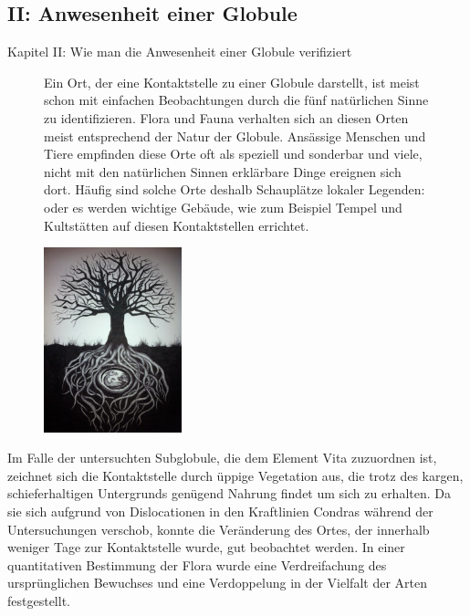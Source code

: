 \documentclass[a5paper,8pt]{book}
\begin{document}
\newpage

\subsection{II: Anwesenheit einer Globule}

Kapitel II: Wie man die Anwesenheit einer Globule verifiziert

\begin{figure}[htbp]
\begin{minipage}[t]{3cm}
\vspace{0pt}
Ein Ort, der eine Kontaktstelle zu einer Globule darstellt, ist meist schon mit einfachen Beobachtungen durch die fünf 
natürlichen Sinne zu identifizieren. Flora und Fauna verhalten sich an diesen Orten meist entsprechend der Natur der 
Globule. Ansässige Menschen und Tiere empfinden diese Orte oft als speziell und sonderbar und viele, nicht mit den 
natürlichen Sinnen erklärbare Dinge ereignen sich dort. Häufig sind solche Orte deshalb Schauplätze lokaler Legenden: 
oder es werden wichtige Gebäude, wie zum Beispiel Tempel und Kultstätten auf diesen Kontaktstellen errichtet.
\begin{minipage}[t]{4cm}
\vspace{0pt}
  \begin{flushright}
	\includegraphics[width=4cm]{pictures/drachenbaum.jpg}
  \end{flushright}
\end{minipage}
\hfill
\end{minipage}
\end{figure}

Im Falle der untersuchten Subglobule, die dem Element Vita zuzuordnen ist, zeichnet sich die Kontaktstelle durch üppige 
Vegetation aus, die trotz des kargen, schieferhaltigen Untergrunds genügend Nahrung findet um sich zu erhalten. Da sie 
sich aufgrund von Dislocationen in den Kraftlinien Condras während der Untersuchungen verschob, konnte die Veränderung 
des Ortes, der innerhalb weniger Tage zur Kontaktstelle wurde, gut beobachtet werden. In einer quantitativen Bestimmung 
der Flora wurde eine Verdreifachung des ursprünglichen Bewuchses und eine Verdoppelung in der Vielfalt der Arten 
festgestellt.
\end{document}
